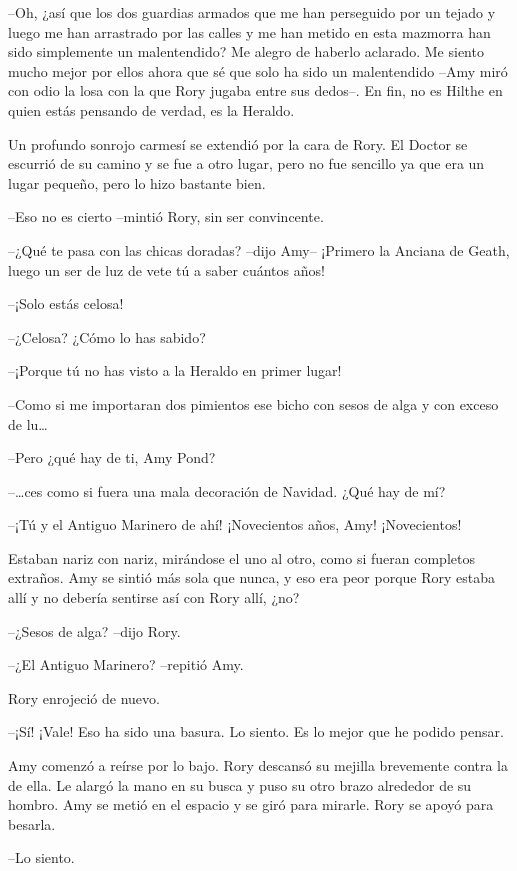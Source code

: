 {--Oh, ¿así que los dos guardias armados que me han perseguido por un
	tejado y luego me han arrastrado por las calles y me han metido en esta
	mazmorra han sido simplemente un malentendido? Me alegro de haberlo
	aclarado. Me siento mucho mejor por ellos ahora que sé que solo ha sido
	un malentendido --Amy miró con odio la losa con la que Rory jugaba entre
	sus dedos--. En fin, no es Hilthe en quien estás pensando de verdad, es
la Heraldo.}

{Un profundo sonrojo carmesí se extendió por la cara de Rory. El Doctor
	se escurrió de su camino y se fue a otro lugar, pero no fue sencillo ya
que era un lugar pequeño, pero lo hizo bastante bien.}

{--Eso no es cierto --mintió Rory, sin ser convincente.}

{--¿Qué te pasa con las chicas doradas? --dijo Amy-- ¡Primero la
Anciana de Geath, luego un ser de luz de vete tú a saber cuántos años!}

{--¡Solo estás celosa!}

{--¿Celosa? ¿Cómo lo has sabido?}

{--¡Porque tú no has visto a la Heraldo en primer lugar!}

{--Como si me importaran dos pimientos ese bicho con sesos de alga y
	con exceso de lu\ldots{}}

{--Pero ¿qué hay de ti, Amy Pond?}

{--\ldots{}}{ces como si fuera una mala decoración de Navidad. ¿Qué hay
de mí?}

{--¡Tú y el Antiguo Marinero de ahí! ¡Novecientos años, Amy!
¡Novecientos!}

{Estaban nariz con nariz, mirándose el uno al otro, como si fueran
	completos extraños. Amy se sintió más sola que nunca, y eso era peor
porque Rory estaba allí y no debería sentirse así con Rory allí, ¿no?}

{--¿Sesos de alga? --dijo Rory.}

{--¿El Antiguo Marinero? --repitió Amy.}

{Rory enrojeció de nuevo.}

{--¡Sí! ¡Vale! Eso ha sido una basura. Lo siento. Es lo mejor que he
podido pensar.}

{Amy comenzó a reírse por lo bajo. Rory descansó su mejilla brevemente
	contra la de ella. Le alargó la mano en su busca y puso su otro brazo
	alrededor de su hombro. Amy se metió en el espacio y se giró para
mirarle. Rory se apoyó para besarla.}

{--Lo siento.}

